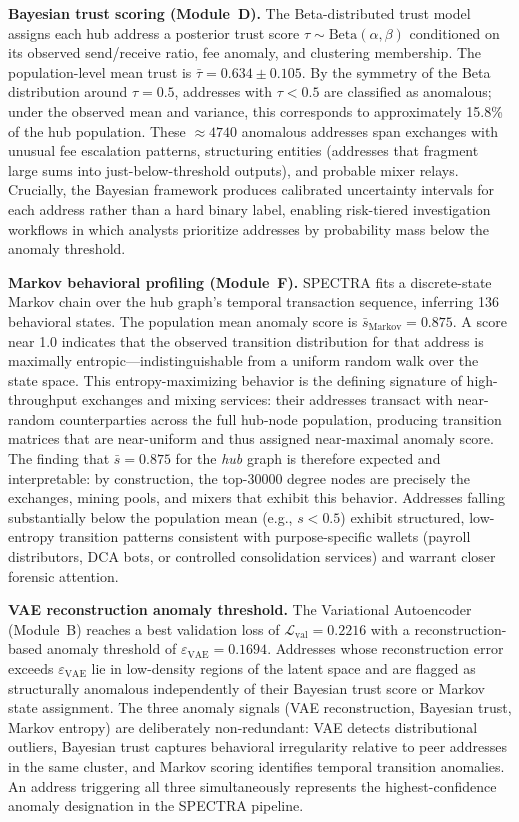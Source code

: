 \documentclass[journal]{IEEEtran}
\begin{document}
\textbf{Bayesian trust scoring (Module~D).}
The Beta-distributed trust model assigns each hub address a posterior
trust score $\tau \sim \mathrm{Beta}(\alpha, \beta)$ conditioned on its
observed send/receive ratio, fee anomaly, and clustering membership.
The population-level mean trust is $\bar{\tau} = \num{0.634} \pm \num{0.105}$.
By the symmetry of the Beta distribution around $\tau = 0.5$, addresses
with $\tau < 0.5$ are classified as anomalous; under the observed mean and
variance, this corresponds to approximately \num{15.8}\% of the hub
population.
These $\approx \num{4740}$ anomalous addresses span exchanges with unusual
fee escalation patterns, structuring entities (addresses that fragment large
sums into just-below-threshold outputs), and probable mixer relays.
Crucially, the Bayesian framework produces calibrated uncertainty intervals
for each address rather than a hard binary label, enabling risk-tiered
investigation workflows in which analysts prioritize addresses by
probability mass below the anomaly threshold.

\textbf{Markov behavioral profiling (Module~F).}
SPECTRA fits a discrete-state Markov chain over the hub graph's temporal
transaction sequence, inferring \num{136} behavioral states.
The population mean anomaly score is $\bar{s}_{\text{Markov}} = \num{0.875}$.
A score near \num{1.0} indicates that the observed transition distribution
for that address is maximally entropic---indistinguishable from a
uniform random walk over the state space.
This entropy-maximizing behavior is the defining signature of high-throughput
exchanges and mixing services: their addresses transact with near-random
counterparties across the full hub-node population, producing transition
matrices that are near-uniform and thus assigned near-maximal anomaly score.
The finding that $\bar{s} = \num{0.875}$ for the \emph{hub} graph is
therefore expected and interpretable: by construction, the top-\num{30000}
degree nodes are precisely the exchanges, mining pools, and mixers that
exhibit this behavior.
Addresses falling substantially below the population mean (e.g.,
$s < 0.5$) exhibit structured, low-entropy transition patterns consistent
with purpose-specific wallets (payroll distributors, DCA bots, or
controlled consolidation services) and warrant closer forensic attention.

\textbf{VAE reconstruction anomaly threshold.}
The Variational Autoencoder (Module~B) reaches a best validation loss of
$\mathcal{L}_{\text{val}} = \num{0.2216}$ with a reconstruction-based
anomaly threshold of $\varepsilon_{\text{VAE}} = \num{0.1694}$.
Addresses whose reconstruction error exceeds $\varepsilon_{\text{VAE}}$
lie in low-density regions of the latent space and are flagged as
structurally anomalous independently of their Bayesian trust score or
Markov state assignment.
The three anomaly signals (VAE reconstruction, Bayesian trust, Markov
entropy) are deliberately non-redundant: VAE detects distributional
outliers, Bayesian trust captures behavioral irregularity relative to
peer addresses in the same cluster, and Markov scoring identifies
temporal transition anomalies.
An address triggering all three simultaneously represents the
highest-confidence anomaly designation in the SPECTRA pipeline.
\end{document}
